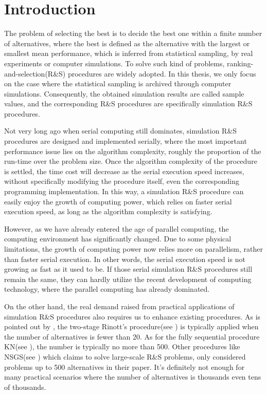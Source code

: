 \chapter{Introduction}

The problem of selecting the best is to decide the best one within a finite number of alternatives, where the best is defined as the alternative with the largest or smallest mean performance, which is inferred from statistical sampling, by real experiments or computer simulations. To solve such kind of problems, ranking-and-selection(R\&S) procedures are widely adopted. In this thesis, we only focus on the case where the statistical sampling is archived through computer simulations. Consequently, the obtained simulation results are called sample values, and the corresponding R\&S procedures are specifically simulation R\&S procedures.

Not very long ago when serial computing still dominates, simulation R\&S procedures are designed and implemented serially, where the most important performance issue lies on the algorithm complexity, roughly the proportion of the run-time over the problem size. Once the algorithm complexity of the procedure is settled, the time cost will decrease as the serial execution speed increases, without specifically modifying the procedure itself, even the corresponding programming implementation. In this way, a simulation R\&S procedure can easily enjoy the growth of computing power, which relies on faster serial execution speed, as long as the algorithm complexity is satisfying.

However, as we have already entered the age of parallel computing, the computing environment has significantly changed. Due to some physical limitations, the growth of computing power now relies more on parallelism, rather than faster serial execution. In other words, the serial execution speed is not growing as fast as it used to be. If those serial simulation R\&S procedures still remain the same, they can hardly utilize the recent development of computing technology, where the parallel computing has already dominated.

On the other hand, the real demand raised from practical applications of simulation R\&S procedures also requires us to enhance existing procedures. As is pointed out by \cite{ehiorams06ras}, the two-stage Rinott's procedure(see \cite{cistam1978rinott}) is typically applied when the number of alternatives is fewer than 20. As for the fully sequential procedure KN(see \cite{tomacs01kn}), the number is typically no more than 500. Other procedures like NSGS(see \cite{or01nsgs}) which claims to solve large-scale R\&S problems, only considered problems up to 500 alternatives in their paper. It's definitely not enough for many practical scenarios where the number of alternatives is thousands even tens of thousands.

